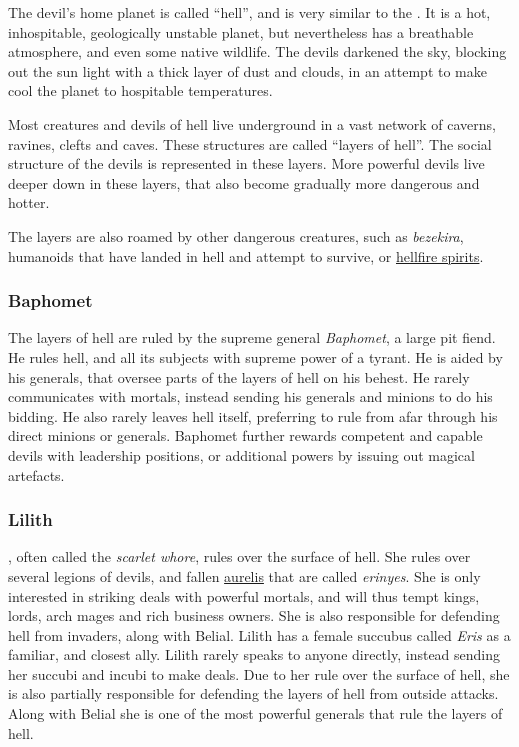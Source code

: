The devil's home planet is called ``hell'', and is very similar to the
. It is a hot, inhospitable, geologically unstable planet,
but nevertheless has a breathable atmosphere, and even some native
wildlife. The devils darkened the sky, blocking out the sun light with a thick
layer of dust and clouds, in an attempt to make cool the planet to hospitable
temperatures.

Most creatures and devils of hell live underground in a vast network of
caverns, ravines, clefts and caves. These structures are called ``layers of
hell''. The social structure of the devils is represented in these layers.
More powerful devils live deeper down in these layers, that also become
gradually more dangerous and hotter.

The layers are also roamed by other dangerous creatures, such as
\emph{bezekira}, humanoids that have landed in hell and attempt to survive,
or \hyperref[sec:monster:Hellfire Spirit]{hellfire spirits}.

\subsubsection{Baphomet}
\label{sec:Baphomet}

The layers of hell are ruled by the supreme general \emph{Baphomet}, a large
pit fiend. He rules hell, and all its subjects with supreme power of a
tyrant. He is aided by his generals, that oversee parts of the layers of
hell on his behest. He rarely communicates with mortals, instead sending his
generals and minions to do his bidding. He also rarely leaves hell itself,
preferring to rule from afar through his direct minions or generals. Baphomet
further rewards competent and capable devils with leadership positions, or
additional powers by issuing out magical artefacts.

\subsubsection{Lilith}

, often called the \emph{scarlet whore}, rules over the
surface of hell. She rules over several legions of devils, and fallen
\hyperref[sec:Aurelis]{aurelis} that are called \emph{erinyes}. She is only
interested in striking deals with powerful mortals, and will thus tempt kings,
lords, arch mages and rich business owners. She is also responsible for
defending hell from invaders, along with Belial. Lilith has a female succubus
called \emph{Eris} as a familiar, and closest ally. Lilith rarely speaks to
anyone directly, instead sending her succubi and incubi to make deals. Due
to her rule over the surface of hell, she is also partially responsible for
defending the layers of hell from outside attacks. Along with Belial she is
one of the most powerful generals that rule the layers of hell.

